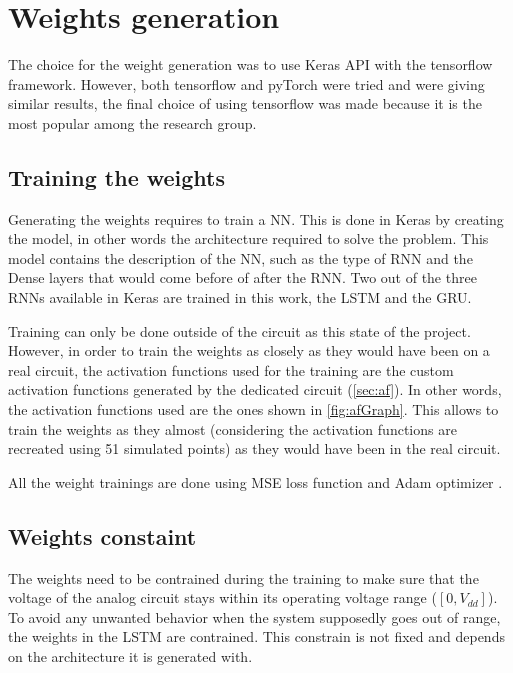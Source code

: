 \section{Weights generation}
\label{sec:genwei}

The choice for the weight generation was to use Keras API with the tensorflow framework. However, both tensorflow and pyTorch were tried and were giving similar results, the final choice of using tensorflow was made because it is the most popular among the research group.

\subsection{Training the weights}

Generating the weights requires to train a \ac{NN}. This is done in Keras by creating the model, in other words the architecture required to solve the problem. This model contains the description of the \ac{NN}, such as the type of \ac{RNN} and the Dense layers that would come before of after the \ac{RNN}. Two out of the three \acp{RNN} available in Keras are trained in this work, the \ac{LSTM} and the \ac{GRU}.

Training can only be done outside of the circuit as this state of the project. However, in order to train the weights as closely as they would have been on a real circuit, the activation functions used for the training are the custom activation functions generated by the dedicated circuit (\cref{sec:af}). In other words, the activation functions used are the ones shown in \cref{fig:afGraph}. This allows to train the weights as they almost (considering the activation functions are recreated using 51 simulated points) as they would have been in the real circuit.

All the weight trainings are done using \ac{MSE} loss function and Adam optimizer \cite{adamOpti}.

\subsection{Weights constaint}

The weights need to be contrained during the training to make sure that the voltage of the analog circuit stays within its operating voltage range ($[0,V_{dd}]$). To avoid any unwanted behavior when the system supposedly goes out of range, the weights in the \ac{LSTM} are contrained. This constrain is not fixed and depends on the architecture it is generated with.

